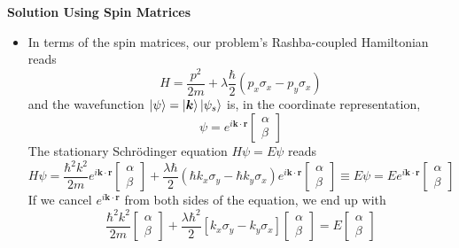 \documentclass[11pt, a4paper]{article}
\newcommand{\Schro}{Schr\"{o}dinger\xspace}
\renewcommand{\vec}[1]{\bm{#1}} %
\renewcommand{\k}{\vec{k}}  %
\begin{document}
\textbf{Solution Using Spin Matrices}
\begin{itemize}
	\item In terms of the spin matrices, our problem's Rashba-coupled Hamiltonian reads
	\begin{equation*}
		H = \frac{p^{2}}{2m} + \lambda \frac{\hbar}{2}(p_{x}\sigma_{x} - p_{y}\sigma_{x})
	\end{equation*} 
	and the wavefunction $  \ket{\psi} = \ket{\vec{k}}\ket{\psi_{s}} $ is, in the coordinate representation,
	\begin{equation*}
		\psi = e^{i\vec{k}\cdot \vec{r}} 
		\begin{bmatrix}
		\alpha\\
		\beta
		\end{bmatrix}
	\end{equation*}
	The stationary \Schro equation $ H \psi = E \psi $ reads
	\begin{equation*}
		H \psi = \frac{\hbar^{2}k^{2}}{2m} e^{i\k \cdot \vec{r}}
		\begin{bmatrix}
			\alpha\\
			\beta
		\end{bmatrix}
		+ \frac{\lambda \hbar}{2}\left(\hbar k_{x}\sigma_{y} - \hbar k_{y}\sigma_{x}\right)
		e^{i\k \cdot \vec{r}}
		\begin{bmatrix}
			\alpha\\
			\beta
		\end{bmatrix}
		\equiv E \psi = E e^{i\k \cdot \vec{r}}
		\begin{bmatrix}
			\alpha\\
			\beta
		\end{bmatrix}
	\end{equation*}
	If we cancel $ e^{i\k \cdot \vec{r}} $ from both sides of the equation, we end up with
	\begin{equation*}
		\frac{\hbar^{2}k^{2}}{2m}
		\begin{bmatrix}
			\alpha\\
			\beta
		\end{bmatrix} + 
		\frac{\lambda\hbar^{2}}{2}	
		\left[k_{x}\sigma_{y} - k_{y}\sigma_{x}\right]
		\begin{bmatrix}
			\alpha\\
			\beta
		\end{bmatrix}
		 = E
		\begin{bmatrix}
			\alpha\\
			\beta
		\end{bmatrix}
	\end{equation*}
	

\end{itemize}
\end{document}

